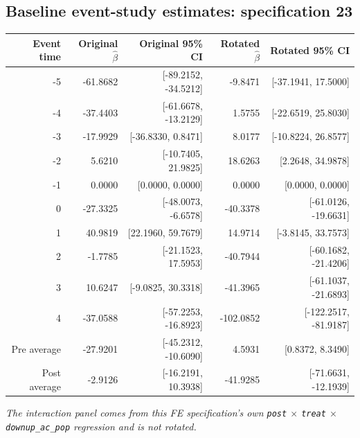 \documentclass[10pt]{article}
\begin{document}
\subsection*{Baseline event-study estimates: specification 23}
\begin{center}
\scriptsize
\begin{tabular}{r rr rr}
\toprule
Event time & Original $\hat\beta$ & Original 95\% CI & Rotated $\hat\beta$ & Rotated 95\% CI \\
\midrule
-5 & -61.8682 & [-89.2152, -34.5212] & -9.8471 & [-37.1941, 17.5000] \\
-4 & -37.4403 & [-61.6678, -13.2129] & 1.5755 & [-22.6519, 25.8030] \\
-3 & -17.9929 & [-36.8330, 0.8471] & 8.0177 & [-10.8224, 26.8577] \\
-2 & 5.6210 & [-10.7405, 21.9825] & 18.6263 & [2.2648, 34.9878] \\
-1 & 0.0000 & [0.0000, 0.0000] & 0.0000 & [0.0000, 0.0000] \\
0 & -27.3325 & [-48.0073, -6.6578] & -40.3378 & [-61.0126, -19.6631] \\
1 & 40.9819 & [22.1960, 59.7679] & 14.9714 & [-3.8145, 33.7573] \\
2 & -1.7785 & [-21.1523, 17.5953] & -40.7944 & [-60.1682, -21.4206] \\
3 & 10.6247 & [-9.0825, 30.3318] & -41.3965 & [-61.1037, -21.6893] \\
4 & -37.0588 & [-57.2253, -16.8923] & -102.0852 & [-122.2517, -81.9187] \\
\midrule
Pre average & -27.9201 & [-45.2312, -10.6090] & 4.5931 & [0.8372, 8.3490] \\
Post average & -2.9126 & [-16.2191, 10.3938] & -41.9285 & [-71.6631, -12.1939] \\
\bottomrule
\end{tabular}
\end{center}
\medskip
\textit{The interaction panel comes from this FE specification's own \texttt{post} $\times$ \texttt{treat} $\times$ \texttt{downup\_ac\_pop} regression and is not rotated.}
\clearpage
\end{document}
